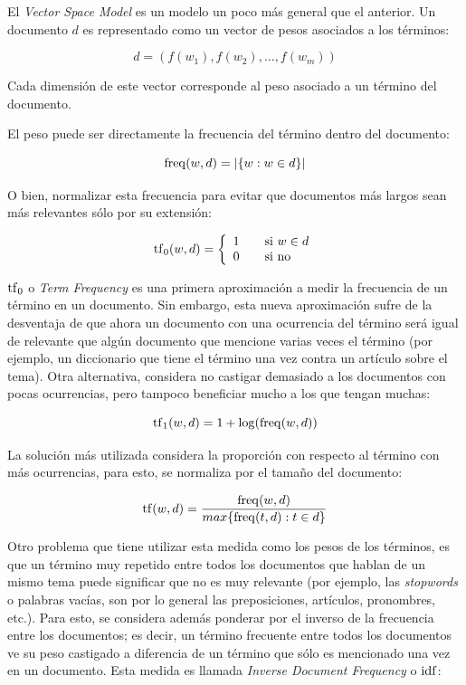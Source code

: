     El \emph{Vector Space Model} es un modelo un poco más general que el
    anterior. Un documento $d$ es representado como un vector de pesos
    asociados a los términos:

    $$d = (f(w_1), f(w_2), \ldots, f(w_m))$$

    Cada dimensión de este vector corresponde al peso asociado a un
    término del documento.

    El peso puede ser directamente la frecuencia del término dentro
    del documento:

    $$\operatorname{freq}(w,d) = |\{w : w \in d\}|$$

    O bien, normalizar esta frecuencia para evitar que documentos más
    largos sean más relevantes sólo por su extensión:

    $$\operatorname{tf}_0(w,d) = \left\{
    \begin{array}{l l}
    1 & \quad \textrm{si $w \in d$}\\
    0 & \quad \textrm{si no}\\
    \end{array} \right.$$

    $\operatorname{tf}_0$ o \emph{Term Frequency} es una primera aproximación a medir la
    frecuencia de un término en un documento. Sin embargo, esta nueva
    aproximación sufre de la desventaja de que ahora un documento con
    una ocurrencia del término será igual de relevante que algún
    documento que mencione varias veces el término (por ejemplo, un
    diccionario que tiene el término una vez contra un artículo sobre
    el tema). Otra alternativa, considera no castigar demasiado a los
    documentos con pocas ocurrencias, pero tampoco beneficiar mucho a
    los que tengan muchas:

    $$\operatorname{tf}_1(w,d) = 1 + \log(\operatorname{freq}(w,d))$$

    La solución más utilizada considera la proporción con respecto al
    término con más ocurrencias, para esto, se normaliza por el tamaño
    del documento:

    $$\operatorname{tf}(w,d) = \frac{\operatorname{freq}(w,d)}{max\{\operatorname{freq}(t,d) : t \in d\}}$$

    Otro problema que tiene utilizar esta medida como los pesos de los
    términos, es que un término muy repetido entre todos los
    documentos que hablan de un mismo tema puede significar que no es
    muy relevante (por ejemplo, las \emph{stopwords} o palabras vacías, son
    por lo general las preposiciones, artículos, pronombres,
    etc.). Para esto, se considera además ponderar por el inverso de
    la frecuencia entre los documentos; es decir, un término frecuente
    entre todos los documentos ve su peso castigado a diferencia de un
    término que sólo es mencionado una vez en un documento. Esta
    medida es llamada \emph{Inverse Document Frequency} o $\operatorname{idf}$:

